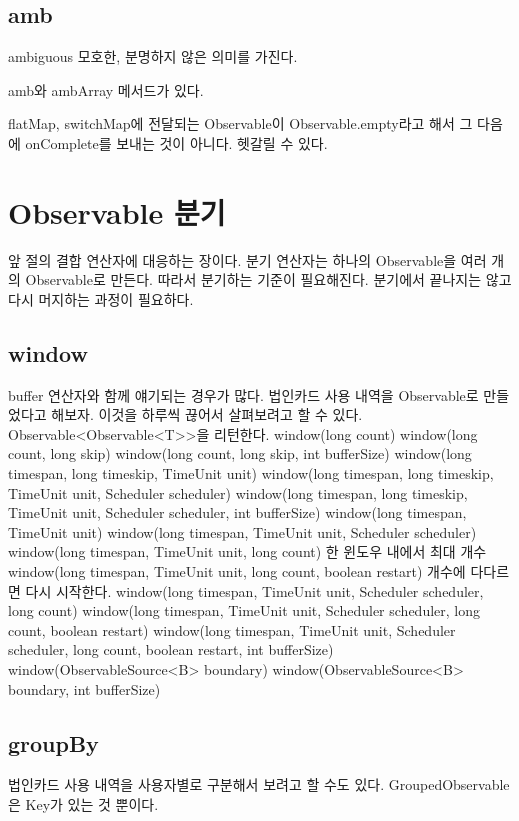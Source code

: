 \documentclass{book}
\begin{document}
{\subsection{amb}
ambiguous
모호한, 분명하지 않은 의미를 가진다.

amb와 ambArray 메서드가 있다.

flatMap, switchMap에 전달되는 Observable이 Observable.empty라고 해서 그 다음에 onComplete를 보내는 것이 아니다. 헷갈릴 수 있다.

\section{Observable 분기}
앞 절의 결합 연산자에 대응하는 장이다. 
분기 연산자는 하나의 Observable을 여러 개의 Observable로 만든다.
따라서 분기하는 기준이 필요해진다.
분기에서 끝나지는 않고 다시 머지하는 과정이 필요하다.

\subsection{window}
buffer 연산자와 함께 얘기되는 경우가 많다.
법인카드 사용 내역을 Observable로 만들었다고 해보자.
이것을 하루씩 끊어서 살펴보려고 할 수 있다. 
Observable<Observable<T>>을 리턴한다.
window(long count)
window(long count, long skip)
window(long count, long skip, int bufferSize)
window(long timespan, long timeskip, TimeUnit unit)
window(long timespan, long timeskip, TimeUnit unit, Scheduler scheduler)
window(long timespan, long timeskip, TimeUnit unit, Scheduler scheduler, int bufferSize)
window(long timespan, TimeUnit unit)
window(long timespan, TimeUnit unit, Scheduler scheduler)
window(long timespan, TimeUnit unit, long count)
한 윈도우 내에서 최대 개수
window(long timespan, TimeUnit unit, long count, boolean restart)
개수에 다다르면 다시 시작한다.
window(long timespan, TimeUnit unit,
            Scheduler scheduler, long count)
window(long timespan, TimeUnit unit,
            Scheduler scheduler, long count, boolean restart)
window(long timespan, TimeUnit unit, Scheduler scheduler,
            long count, boolean restart, int bufferSize)
window(ObservableSource<B> boundary)
window(ObservableSource<B> boundary, int bufferSize)
            
\subsection{groupBy}
법인카드 사용 내역을 사용자별로 구분해서 보려고 할 수도 있다.
GroupedObservable은 Key가 있는 것 뿐이다.

}
\end{document}
